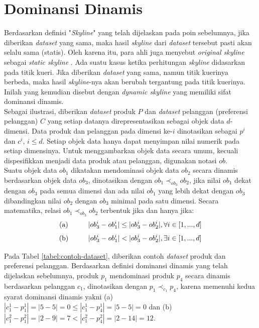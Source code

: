 \section{Dominansi Dinamis}
\tab Berdasarkan definisi "\textit{Skyline}" yang telah dijelaskan pada poin sebelumnya, jika diberikan \textit{dataset} yang sama, maka hasil \textit{skyline} dari \textit{dataset} tersebut pasti akan selalu sama (statis). Oleh karena itu, para ahli juga menyebut \textit{original skyline} sebagai \textit{static skyline} \cite{dynamic-skyline-2}. Ada suatu kasus ketika perhitungan \textit{skyline} didasarkan pada titik kueri. Jika diberikan \textit{dataset} yang sama, namun titik kuerinya berbeda, maka hasil \textit{skyline}-nya akan berubah tergantung pada titik kuerinya. Inilah yang kemudian disebut dengan \textit{dynamic skyline} yang memiliki sifat dominansi dinamis.\\ 
\tab Sebagai ilustrasi, diberikan \textit{dataset} produk $P$ dan \textit{dataset} pelanggan (preferensi pelanggan) $C$ yang setiap datanya direpresentasikan sebagai objek data $d$-dimensi. Data produk dan pelanggan pada dimensi ke-$i$ dinotasikan sebagai $p^i$ dan $c^i$, $i \leq d$. Setiap objek data hanya dapat menyimpan nilai numerik pada setiap dimensinya. Untuk menggambarkan objek data secara umum, kecuali dispesifikkan menjadi data produk atau pelanggan, digunakan notasi $ob$. \\
\tab Suatu objek data $ob_1$ dikatakan mendominasi objek data $ob_2$ secara dinamis berdasarkan objek data $ob_3$, dinotasikan dengan $ob_1 \prec_{ob_3} ob_2$, jika nilai $ob_1$ dekat dengan $ob_3$ pada semua dimensi dan ada nilai $ob_1$ yang lebih dekat dengan $ob_3$ dibandingkan nilai $ob_2$ dengan $ob_3$ minimal pada satu dimensi. Secara matematika, relasi $ob_1 \prec_{ob_3} ob_2$ terbentuk jika dan hanya jika:
\[\text{(a)} \hspace*{1cm} |ob_3^i - ob_1^i| \leq |ob_3^i - ob_2^i|, \forall i \in [1, ..., d]\]
\[\text{(b)} \hspace*{1cm} |ob_3^i - ob_1^i| < |ob_3^i - ob_2^i|, \exists i \in [1, ..., d]\]

Pada Tabel \ref{tabel:contoh-dataset}, diberikan contoh \textit{dataset} produk dan preferensi pelanggan. Berdasarkan definisi dominansi dinamis yang telah dijelaskan sebelumnya, produk $p_1$ mendominasi produk $p_4$ secara dinamis berdasarkan pelanggan $c_1$, dinotasikan dengan $p_1 \prec_{c_1} p_4$, karena memenuhi kedua syarat dominansi dinamis yakni (a) $|c_1^1 - p_1^1| = |5-5| = 0 \leq |c_1^1 - p_4^1| = |5-5| = 0$ dan (b) $|c_1^2 - p_1^2| = |2-9| = 7 < |c_1^2 - p_4^2| = |2-14| = 12$.\\ 

